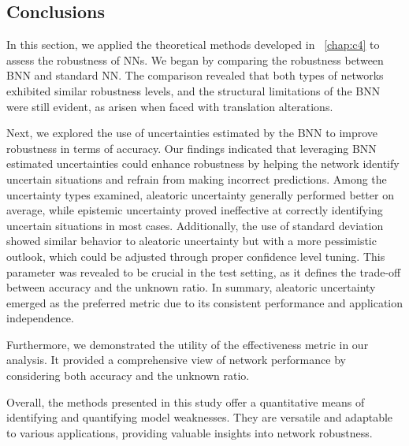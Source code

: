 \subsection{Conclusions}

In this section, we applied the theoretical methods developed in \Chap~\ref{chap:c4} to assess the robustness of NNs. We began by comparing the robustness between BNN and standard NN. The comparison revealed that both types of networks exhibited similar robustness levels, and the structural limitations of the BNN were still evident, as arisen when faced with translation alterations.

Next, we explored the use of uncertainties estimated by the BNN to improve robustness in terms of accuracy. Our findings indicated that leveraging BNN estimated uncertainties could enhance robustness by helping the network identify uncertain situations and refrain from making incorrect predictions. Among the uncertainty types examined, aleatoric uncertainty generally performed better on average, while epistemic uncertainty proved ineffective at correctly identifying uncertain situations in most cases. Additionally, the use of standard deviation showed similar behavior to aleatoric uncertainty but with a more pessimistic outlook, which could be adjusted through proper confidence level tuning. This parameter was revealed to be crucial in the test setting, as it defines the trade-off between accuracy and the unknown ratio. In summary, aleatoric uncertainty emerged as the preferred metric due to its consistent performance and application independence.

Furthermore, we demonstrated the utility of the effectiveness metric in our analysis. It provided a comprehensive view of network performance by considering both accuracy and the unknown ratio.

Overall, the methods presented in this study offer a quantitative means of identifying and quantifying model weaknesses. They are versatile and adaptable to various applications, providing valuable insights into network robustness.